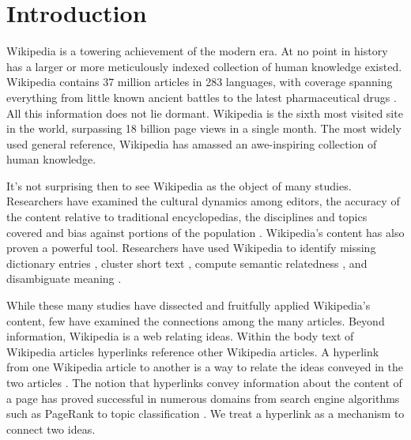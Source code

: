 \documentclass[pre,twocolumn,twoside,superscriptaddress,floatfix, aps, 10pt]{revtex4-1}
\begin{document}
\maketitle

\section*{Introduction}



Wikipedia is a towering achievement of the modern era. 
At no point in history has a larger or more meticulously indexed collection of human knowledge 
existed.
Wikipedia contains 37 million articles in 283 languages, 
with coverage spanning everything from little known ancient battles to the latest pharmaceutical drugs 
\cite{stats} \cite{drugs}.
All this information does not lie dormant. 
Wikipedia is the sixth most visited
site in the world, surpassing 18 billion page views in a single month. 
The most widely used general reference, Wikipedia has amassed an awe-inspiring collection of human knowledge.

It's not surprising then to see Wikipedia as the object of many studies. 
Researchers have examined the cultural dynamics among editors,
\cite{editors}
the accuracy of the content relative to traditional encyclopedias,
\cite{accuracy1}
\cite{accuracy2}
the disciplines and topics covered 
\cite{coverage}
and bias against portions of the population
\cite{bias_women}.
Wikipedia's content has also proven a powerful tool. 
Researchers have used Wikipedia to identify missing dictionary entries
\cite{missing_entries},
cluster short text
\cite{clustering},
compute semantic relatedness
\cite{semantic_relatedness},
and disambiguate meaning \cite{disambiguating}.

While these many studies have dissected and fruitfully applied Wikipedia's content,
few have examined the connections among the many articles.
Beyond information, Wikipedia is a web 
relating ideas. 
Within the body text of Wikipedia articles hyperlinks reference
other Wikipedia articles.
A hyperlink from one Wikipedia article to another is a way to relate the ideas
conveyed in the two articles 
\cite{relevance}.
The notion that hyperlinks convey information about the content of a
page has proved successful in numerous domains from search engine algorithms 
such as PageRank 
\cite{pagerank} 
to topic classification
\cite{classifier}.
We treat a hyperlink as a mechanism to connect two ideas. 
\end{document}
